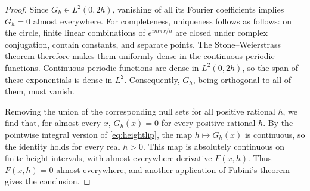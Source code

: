 \documentclass[12pt,a4paper]{article}
\theoremstyle{remark}
\begin{document}
\begin{proof}
Since $G_h\in L^2(0,2h)$, vanishing of all its Fourier coefficients implies $G_h=0$ almost everywhere.
For completeness, uniqueness follows as follows: on the circle, finite linear combinations of $e^{im\pi x/h}$ are closed under complex conjugation,
contain constants, and separate points. The Stone--Weierstrass theorem  therefore makes them uniformly dense in the continuous periodic functions.
Continuous periodic functions are dense in $L^2(0,2h)$, so the span of these exponentials is dense in $L^2$.
Consequently, $G_h$, being orthogonal to all of them, must vanish.


Removing the union of the corresponding null sets for all positive rational $h$, we find that, for almost every $x$,
$G_h(x)=0$ for every positive rational $h$. By the pointwise integral version of \eqref{eq:heightlip},
the map $h\mapsto G_h(x)$ is continuous, so the identity holds for every real $h>0$.
This map is absolutely continuous on finite height intervals, with almost-everywhere derivative $F(x,h)$.
Thus $F(x,h)=0$ almost everywhere, and another application of Fubini's theorem gives the conclusion.
\end{proof}
\end{document}
